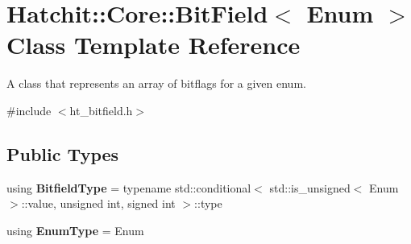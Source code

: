 \hypertarget{classHatchit_1_1Core_1_1BitField}{}\section{Hatchit\+:\+:Core\+:\+:Bit\+Field$<$ Enum $>$ Class Template Reference}
\label{classHatchit_1_1Core_1_1BitField}


A class that represents an array of bitflags for a given enum.  




{\ttfamily \#include $<$ht\+\_\+bitfield.\+h$>$}

\subsection*{Public Types}
\begin{DoxyCompactItemize}
\item 
using {\bfseries Bitfield\+Type} = typename std\+::conditional$<$ std\+::is\+\_\+unsigned$<$ Enum $>$\+::value, unsigned int, signed int $>$\+::type\hypertarget{classHatchit_1_1Core_1_1BitField_a8baaae3621a4946f3e7c3a881df3f6c6}{}\label{classHatchit_1_1Core_1_1BitField_a8baaae3621a4946f3e7c3a881df3f6c6}

\item 
using {\bfseries Enum\+Type} = Enum\hypertarget{classHatchit_1_1Core_1_1BitField_aacdaa25135b74eb6cb11a844c5a6f1a4}{}\label{classHatchit_1_1Core_1_1BitField_aacdaa25135b74eb6cb11a844c5a6f1a4}

\end{DoxyCompactItemize}
